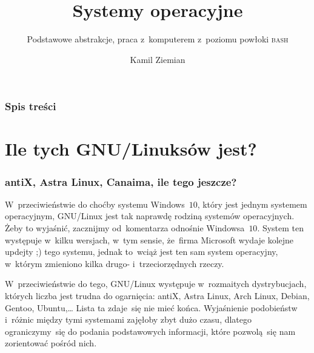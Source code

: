 \documentclass[10pt,t]{beamer}
\title{Systemy operacyjne}
\subtitle{Podstawowe abstrakcje, praca z~komputerem
  z~poziomu powłoki \textsc{bash}}
\author{Kamil Ziemian \\
  \email}
\begin{document}





\RaggedRight





\maketitle





\begin{frame}
  \frametitle{Spis treści}


  \tableofcontents

\end{frame}










\section{Ile tych GNU/Linuksów jest?}


\begin{frame}
  \frametitle{antiX, Astra Linux, Canaima, ile tego jeszcze?}


  W~przeciwieństwie do choćby systemu Windows~$10$, który jest jednym
  systemem operacyjnym, GNU/Linux jest tak naprawdę \alert{rodziną systemów}
  operacyjnych. Żeby to wyjaśnić, zacznijmy od~komentarza odnośnie
  Windowsa~$10$. System ten występuje w~kilku wersjach, w~tym sensie,
  że~firma Microsoft wydaje kolejne updejty ;) tego systemu, jednak to~wciąż
  jest ten sam system operacyjny, w~którym zmieniono kilka drugo-
  i~trzeciorzędnych rzeczy.

  W~przeciwieństwie do tego, GNU/Linux występuje w~rozmaitych
  \alert{dystrybucjach}, których liczba jest trudna do ogarnięcia: antiX,
  Astra Linux, Arch Linux, Debian, Gentoo, Ubuntu,\ldots{} Lista ta zdaje~się
  nie mieć końca. Wyjaśnienie podobieństw i~różnic między tymi systemami
  zajęłoby zbyt dużo czasu, dlatego ograniczymy~się do podania
  podstawowych informacji, które pozwolą~się nam zorientować pośród nich.

\end{frame}
\end{document}
